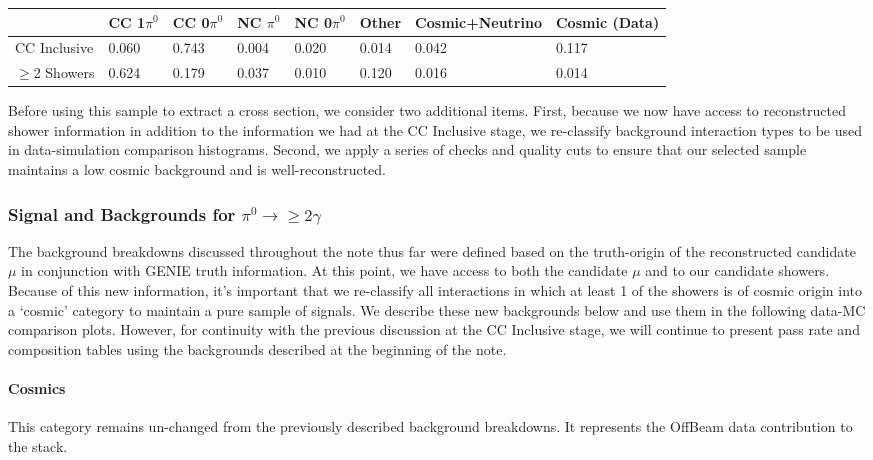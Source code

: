 \begin{table}[H]
\centering
{}
 \begin{tabular}{| l | l | l |l|l|l|l|l|}
 \hline
 & CC 1$\pi^0$ & CC 0$\pi^0$ & NC $\pi^0$ & NC 0$\pi^0$ & Other &Cosmic+Neutrino& Cosmic (Data) \\ [0.1ex] \hline
CC Inclusive & 0.060 & 0.743 & 0.004 & 0.020 & 0.014 & 0.042 & 0.117 \\
$\geq$2 Showers & 0.624 & 0.179 & 0.037 & 0.010 & 0.120 & 0.016 & 0.014\\ \hline
\end{tabular}
\end{table}

Before using this sample to extract a cross section, we consider two additional items. First, because we now have access to reconstructed shower information in addition to the information we had at the CC Inclusive stage, we re-classify background interaction types to be used in data-simulation comparison histograms. Second, we apply a series of checks and quality cuts to ensure that our selected sample maintains a low cosmic background and is well-reconstructed.

\subsubsection{Signal and Backgrounds for $\pi^0\rightarrow\geq 2 \gamma$}
The background breakdowns discussed throughout the note thus far were defined based on the truth-origin of the reconstructed candidate $\mu$ in conjunction with GENIE truth information. At this point, we have access to both the candidate $\mu$ and to our candidate showers.  Because of this new information, it's important that we re-classify all interactions in which at least 1 of the showers is of cosmic origin into a `cosmic' category to maintain a pure sample of signals. We describe these new backgrounds below and use them in the following data-MC comparison plots. However, for continuity with the previous discussion at the CC Inclusive stage, we will continue to present pass rate and composition tables using the backgrounds described at the beginning of the note. 

\paragraph{ Cosmics}
This category remains un-changed from the previously described background breakdowns.  It represents the OffBeam data contribution to the stack. 

